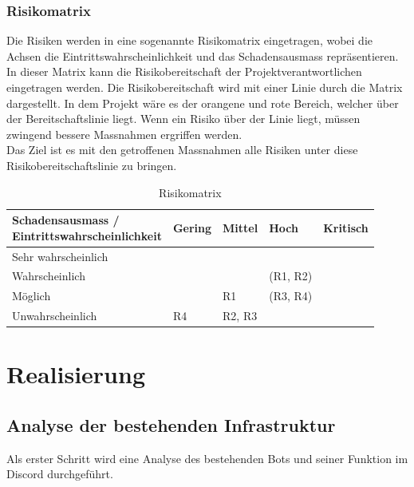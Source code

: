 \documentclass[a4paper, table]{article}
\begin{document}
\subsubsection{Risikomatrix}
Die Risiken werden in eine sogenannte Risikomatrix eingetragen, wobei die Achsen die Eintrittswahrscheinlichkeit und das Schadensausmass repräsentieren.
In dieser Matrix kann die Risikobereitschaft der Projektverantwortlichen eingetragen werden.
Die Risikobereitschaft wird mit einer Linie durch die Matrix dargestellt.
In dem Projekt wäre es der orangene und rote Bereich, welcher über der Bereitschaftslinie liegt.
Wenn ein Risiko über der Linie liegt, müssen zwingend bessere Massnahmen ergriffen werden.\\
Das Ziel ist es mit den getroffenen Massnahmen alle Risiken unter diese Risikobereitschaftslinie zu bringen.

\begin{table}[h]
    \centering
    \begin{tabular}{|l|p{2cm}|p{2cm}|p{2cm}|p{2cm}|}
        \hline
        \shortstack[c]{Schadensausmass / \\ Eintrittswahrscheinlichkeit} & Gering & Mittel & Hoch & Kritisch \\[10pt]
        \hline
        Sehr wahrscheinlich & \cellcolor{yellow!50} & \cellcolor{orange!50} & \cellcolor{red!50} & \cellcolor{red!50} \\[10pt]
        \hline
        Wahrscheinlich & \cellcolor{yellow!50} & \cellcolor{yellow!50}& \cellcolor{orange!50}(R1, R2) & \cellcolor{red!50} \\[10pt]
        \hline
        Möglich & \cellcolor{green!50} & \cellcolor{yellow!50}R1 & \cellcolor{yellow!50}(R3, R4) & \cellcolor{orange!50} \\[10pt]
        \hline
        Unwahrscheinlich & \cellcolor{green!50}R4 & \cellcolor{green!50}R2, R3 & \cellcolor{yellow!50} & \cellcolor{yellow!50} \\[10pt]
        \hline
    \end{tabular}
    \caption{Risikomatrix}
    \label{tab: Riskmatrix}
\end{table}

\clearpage
\section{Realisierung}\label{implementation}

\subsection{Analyse der bestehenden Infrastruktur}
Als erster Schritt wird eine Analyse des bestehenden Bots und seiner Funktion im Discord durchgef\"uhrt.
\end{document}
